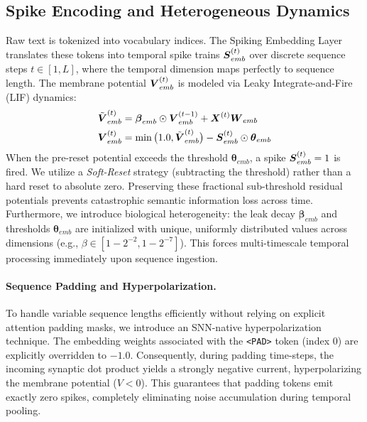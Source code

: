 \documentclass[runningheads]{llncs}
\begin{document}
\subsection{Spike Encoding and Heterogeneous Dynamics}
Raw text is tokenized into vocabulary indices. The Spiking Embedding Layer translates these tokens into temporal spike trains $\boldsymbol{S}_{emb}^{(t)}$ over discrete sequence steps $t \in [1, L]$, where the temporal dimension maps perfectly to sequence length. The membrane potential $\boldsymbol{V}_{emb}^{(t)}$ is modeled via Leaky Integrate-and-Fire (LIF) dynamics:
\begin{equation}
\begin{aligned}
\tilde{\boldsymbol{V}}_{emb}^{(t)} &= \boldsymbol{\beta}_{emb} \odot \boldsymbol{V}_{emb}^{(t-1)} + \boldsymbol{X}^{(t)} \boldsymbol{W}_{emb} \\
\boldsymbol{V}_{emb}^{(t)} &= \min\big(1.0, \tilde{\boldsymbol{V}}_{emb}^{(t)}\big) - \boldsymbol{S}_{emb}^{(t)} \odot \boldsymbol{\theta}_{emb}
\end{aligned}
\end{equation}
When the pre-reset potential exceeds the threshold $\bm{\theta}_{emb}$, a spike $\boldsymbol{S}_{emb}^{(t)} = 1$ is fired. We utilize a \textit{Soft-Reset} strategy (subtracting the threshold) rather than a hard reset to absolute zero. Preserving these fractional sub-threshold residual potentials prevents catastrophic semantic information loss across time. Furthermore, we introduce biological heterogeneity: the leak decay $\bm{\beta}_{emb}$ and thresholds $\bm{\theta}_{emb}$ are initialized with unique, uniformly distributed values across dimensions (e.g., $\beta \in [1 - 2^{-2}, 1 - 2^{-7}]$). This forces multi-timescale temporal processing immediately upon sequence ingestion.

\paragraph{Sequence Padding and Hyperpolarization.} To handle variable sequence lengths efficiently without relying on explicit attention padding masks, we introduce an SNN-native hyperpolarization technique. The embedding weights associated with the \texttt{<PAD>} token (index 0) are explicitly overridden to $-1.0$. Consequently, during padding time-steps, the incoming synaptic dot product yields a strongly negative current, hyperpolarizing the membrane potential ($V < 0$). This guarantees that padding tokens emit exactly zero spikes, completely eliminating noise accumulation during temporal pooling.
\end{document}
